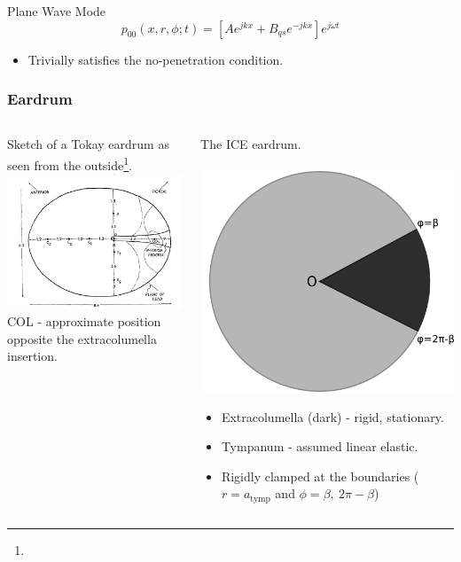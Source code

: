 \documentclass{beamer}
\let\oldfootnotesize\footnotesize
\renewcommand*{\footnotesize}{\oldfootnotesize\tiny}
\begin{document}
\begin{frame}
\begin{exampleblock}{Plane Wave Mode}
 \begin{equation}
  p_{\mathrm{00}}(x,r,\phi;t)=\left[Ae^{jkx}+B_{qs}e^{-jkx}\right]e^{j\omega t}
 \end{equation}
\end{exampleblock}
\begin{itemize}
 \item[] Trivially satisfies the no-penetration condition.
\end{itemize}

\end{frame}

\begin{frame}
\frametitle{Eardrum}
\begin{columns}
    \begin{column}{0.5\textwidth}
      \centering
      \small
      Sketch of a Tokay eardrum as seen from the outside\footnote{}.\\
      \includegraphics[width = 3.7 cm]{Diagrams/geckoear.png}\\
      \footnotesize
     COL - approximate position opposite the extracolumella insertion.
    \end{column}

    \begin{column}{0.5\textwidth}
      \centering
      \small
      The ICE eardrum.\\
      \textbf{}\\
      \includegraphics[width = 3.2 cm]{Diagrams/tympanummodel.png}\\
\footnotesize
\begin{itemize}
      \item[] Extracolumella (dark) - rigid, stationary.
      \item[] Tympanum - assumed linear elastic.
      \item[] Rigidly clamped at the boundaries ($r=a_{\mathrm{tymp}}$ and $\phi=\beta,\ 2\pi-\beta$)
\end{itemize}

    \end{column}
  \end{columns}
  
\end{frame}
\end{document}
